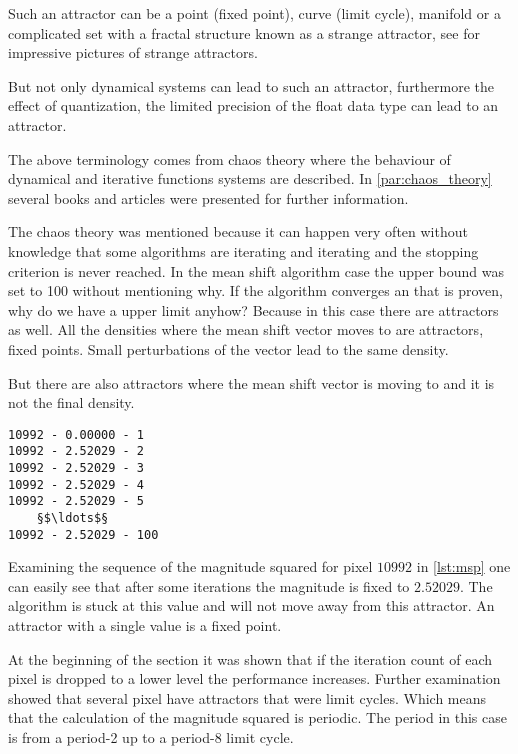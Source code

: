 Such an attractor can be a point (fixed point), curve (limit cycle), manifold or
a complicated set with a fractal structure known as a strange attractor, see
\citeauthor{citeulike:3745535} \citep{citeulike:3745535} for impressive pictures
of strange attractors.

But not only dynamical systems can lead to such an attractor, furthermore the 
effect of quantization, the limited precision of the float data type can lead to
an attractor. 

The above terminology comes from chaos theory where the behaviour of dynamical
and iterative functions systems are described. In \autoref{par:chaos_theory} 
several books and articles were presented for further information. 

The chaos theory was mentioned because it can happen very often without knowledge
that some algorithms are iterating and iterating and the stopping criterion is never
reached. In the mean shift algorithm case the upper bound was set to 100 without
mentioning why. If the algorithm converges an that is proven, why do we have a 
upper limit anyhow? Because in this case there are attractors as well. All the 
densities where the mean shift vector moves to are attractors, fixed points.
Small perturbations of the vector lead to the same density. 

But there are also attractors where the mean shift vector is moving to and it is
not the final density. 

\begin{lstlisting}[caption=Magnitude squared of pixel 10992, label=lst:msp]
10992 - 0.00000 - 1
10992 - 2.52029 - 2
10992 - 2.52029 - 3
10992 - 2.52029 - 4
10992 - 2.52029 - 5
	§$\ldots$§
10992 - 2.52029 - 100
\end{lstlisting}
Examining the sequence of the magnitude squared for pixel $10992$ in
\autoref{lst:msp} one can easily see that after some iterations the magnitude is
fixed to $2.52029$. The algorithm is stuck at this value and will not move away
from this attractor. An attractor with a single value is a fixed point. 

At the beginning of the section it was shown that if the iteration count of each
pixel is dropped to a lower level the performance increases. Further examination
showed that several pixel have attractors that were limit cycles. Which means that
the calculation of the magnitude squared is periodic. The period in this case
is from a period-2 up to a period-8 limit cycle.

